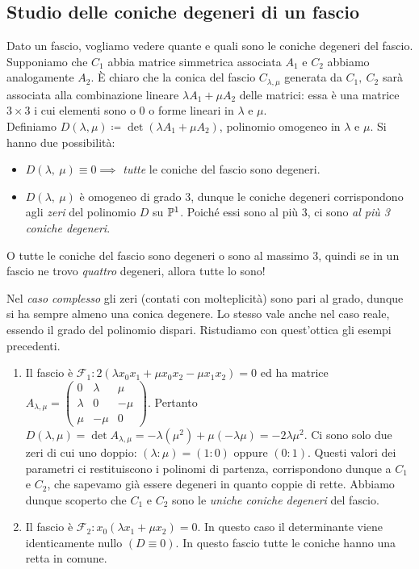 \subsection{Studio delle coniche degeneri di un fascio}
Dato un fascio, vogliamo vedere quante e quali sono le coniche degeneri del fascio. Supponiamo che $C_1$ abbia matrice simmetrica associata $A_1$ e $C_2$ abbiamo analogamente $A_2$. È chiaro che la conica del fascio $C_{\lambda,\mu}$ generata da $C_1,\ C_2$ sarà associata alla combinazione lineare $\lambda A_1+\mu A_2$ delle matrici: essa è una matrice $3\times 3$ i cui elementi sono o $0$ o forme lineari in $\lambda$ e $\mu$.\\
Definiamo $D(\lambda,\mu)\coloneqq \det (\lambda A_1+\mu A_2)$, polinomio omogeneo in $\lambda$ e $\mu$. Si hanno due possibilità:
	\begin{itemize}
		\item	$D(\lambda,\ \mu)\equiv 0\implies$ \textit{tutte} le coniche del fascio sono degeneri.
		\item	$D(\lambda,\ \mu)$ è omogeneo di grado 3, dunque le	coniche degeneri corrispondono agli \textit{zeri} del polinomio $D$ su $\proj[1]{\ }$. Poiché essi sono al più 3, ci sono \textit{al più 3 coniche degeneri}.
	\end{itemize}
\begin{tips}
	O tutte le coniche del fascio sono degeneri o sono al massimo 3, quindi se in un fascio ne trovo \textit{quattro} degeneri, allora tutte lo sono!
\end{tips}
Nel \textit{caso complesso} gli zeri (contati con molteplicità) sono pari al grado, dunque si ha sempre almeno una conica degenere. Lo stesso vale anche nel caso reale, essendo il grado del polinomio dispari.
Ristudiamo con quest'ottica gli esempi precedenti.
\begin{examples}
	\begin{enumerate}
		\item	Il fascio è $\mathcal{F}_1\colon 2(\lambda x_0x_1 +\mu x_0x_2 -\mu x_1x_2)=0$ ed ha matrice $A_{\lambda,\mu}=\begin{pmatrix}
			0 & \lambda & \mu \\
			\lambda & 0 & -\mu \\
			\mu & -\mu & 0
		\end{pmatrix}$. Pertanto $D(\lambda,\mu)=\det A_{\lambda,\mu}=-\lambda(\mu^2)+\mu(-\lambda \mu)=-2\lambda\mu^2$. Ci sono solo due zeri di cui uno doppio: $(\lambda\colon\mu)=(1\colon 0)$ oppure $(0\colon 1)$. Questi valori dei parametri ci restituiscono i polinomi di partenza, corrispondono dunque a $C_1$ e $C_2$, che sapevamo già essere degeneri in quanto coppie di rette. Abbiamo dunque scoperto che $C_1$ e $C_2$ sono le \textit{uniche coniche degeneri} del fascio.
		\item	Il fascio è $\mathcal{F}_2 \colon x_0(\lambda x_1+\mu x_2)=0$. In questo caso il determinante viene identicamente nullo $\left(D\equiv 0\right)$. In questo fascio tutte le coniche hanno una retta in comune.
	\end{enumerate}
\end{examples}

